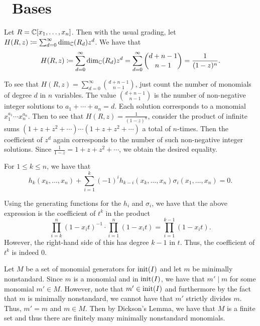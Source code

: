\documentclass[letterpaper, 11pt, oneside]{book}
\begin{document}
\clearpage

\section{\Grobner\ Bases}

\begin{lem}
  Let $R = \mathbb{C}[x_{1}, \ldots, x_{n}]$.
  Then with the usual grading, let $H(R, z) \coloneqq \sum_{d = 0}^{\infty} \dim_{\mathbb{C}}(R_{d}) z^{d}$.
  We have that
  \[
    H(R, z) \coloneqq \sum_{d = 0}^{\infty} \dim_{\mathbb{C}}(R_{d}) z^{d} = \sum_{d = 0}^{\infty} \binom{d + n - 1}{n - 1} = \frac{1}{(1 - z)^{n}}.
  \]
\end{lem}
\begin{pf}
  To see that $H(R, z) = \sum_{d = 0}^{\infty} \binom{d + n - 1}{n - 1}$, just count the number of monomials of degree $d$ in $n$ variables.
  The value $\binom{d + n - 1}{n - 1}$ is the number of non-negative integer solutions to $a_{1} + \cdots + a_{n} = d$.
  Each solution corresponds to a monomial $x_{1}^{a_{1}} \cdots x_{n}^{a_{n}}$.
  Then to see that $H(R, z) = \frac{1}{(1 - z)^{n}}$, consider the product of infinite sums $(1 + z + z^{2} + \cdots) \cdots (1 + z + z^{2} + \cdots)$ a total of $n$-times.
  Then the coefficient of $z^{d}$ again corresponds to the number of such non-negative integer solutions.
  Since $\frac{1}{1 - z} = 1 + z + z^{2} + \cdots$, we obtain the desired equality.
\end{pf}

\begin{lem}
  For $1 \leq k \leq n$, we have that
  \[
    h_{k}(x_{k}, \ldots, x_{n}) + \sum_{i = 1}^{k} (-1)^{i}h_{k - i}(x_{k}, \ldots, x_{n})\sigma_{i}(x_{1}, \ldots, x_{n}) = 0.
  \]
\end{lem}
\begin{pf}
  Using the generating functions for the $h_{i}$ and $\sigma_{i}$, we have that the above expression is the coefficient of $t^{k}$ in the product
  \[
    \prod_{i = k}^{n} (1 - x_{i}t)^{-1} \cdot \prod_{i = 1}^{n}(1 - x_{i} t) = \prod_{i = 1}^{k - 1} (1 - x_{i}t).
  \]
  However, the right-hand side of this has degree $k - 1$ in $t$.
  Thus, the coefficient of $t^{k}$ is indeed $0$.
\end{pf}

\begin{sol}
  Let $M$ be a set of monomial generators for $\operatorname{init}(I)$ and let $m$ be minimally nonstandard.
  Since $m$ is a monomial and in $\operatorname{init}(I)$, we have that $m' \mid m$ for some monomial $m' \in M$.
  However, note that $m' \in \operatorname{init}(I)$ and furthermore by the fact that $m$ is minimally nonstandard, we cannot have that $m'$ strictly divides $m$.
  Thus, $m' = m$ and $m \in M$.
  Then by Dickson's Lemma, we have that $M$ is a finite set and thus there are finitely many minimally nonstandard monomials.
\end{sol}
\end{document}
